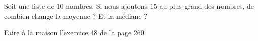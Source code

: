 
\begin{exercice}\label{exosmath-0537}

    Soit une liste de \( 10\) nombres. Si nous ajoutons \( 15\) au plus grand des nombres, de combien change la moyenne ? Et la médiane ?

    Faire à la maison l'exercice 48 de la page 260.

\end{exercice}

